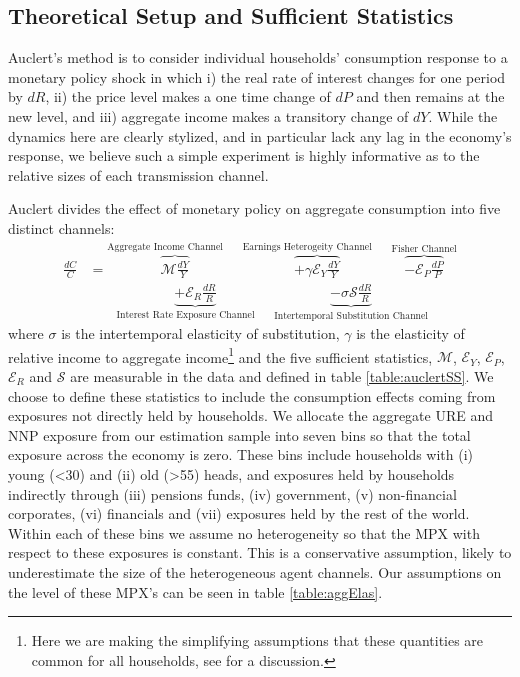 \documentclass[titlepage]{\econtex}\newcommand{\texname}{ConsumptionHeterogeneity}
\begin{document}
\subsection{Theoretical Setup and Sufficient Statistics}
Auclert's method is to consider individual households' consumption response to a monetary policy shock in which i) the real rate of interest changes for one period by $dR$, ii) the price level makes a one time change of $dP$ and then remains at the new level, and iii) aggregate income makes a transitory change of $dY$. While the dynamics here are clearly stylized, and in particular lack any lag in the economy's response, we believe such a simple experiment is highly informative as to the relative sizes of each transmission channel.

Auclert divides the effect of monetary policy on aggregate consumption into five distinct channels:
\begin{align} 
\frac{dC}{C} &= \overbrace{\mathcal{M}\frac{dY}{Y}}^{\text{Aggregate Income Channel}\qquad} \overbrace{ + \gamma \mathcal{E}_Y \frac{dY}{Y}}^{\text{Earnings Heterogeity Channel}\qquad} \overbrace{ - \mathcal{E}_P\frac{dP}{P}}^{\text{Fisher Channel}}  \nonumber \\
& \qquad \underbrace{ + \mathcal{E}_R \frac{dR}{R}}_{\text{Interest Rate Exposure Channel}\qquad}  \underbrace{ - \sigma \mathcal{S}\frac{dR}{R}}_{\text{Intertemporal Substitution Channel}} \label{auclert_channels}
\end{align}
where $\sigma$ is the intertemporal elasticity of substitution, $\gamma$ is the elasticity of relative income to aggregate income\footnote{Here we are making the simplifying assumptions that these quantities are common for all households, see \cite{auclert_monetary_2017} for a discussion.} and the five sufficient statistics, $\mathcal{M}$, $\mathcal{E}_Y$, $\mathcal{E}_P$, $\mathcal{E}_R$ and $\mathcal{S}$ are measurable in the data and defined in table \ref{table:auclertSS}. We choose to define these statistics to include the consumption effects coming from exposures not directly held by households. We allocate the aggregate URE and NNP exposure from our estimation sample into seven bins so that the total exposure across the economy is zero. These bins include households with (i) young (<30) and (ii) old (>55) heads, and exposures held by households indirectly through (iii) pensions funds, (iv) government, (v) non-financial corporates, (vi) financials and (vii) exposures held by the rest of the world. Within each of these bins we assume no heterogeneity so that the MPX with respect to these exposures is constant. This is a conservative assumption, likely to underestimate the size of the heterogeneous agent channels. Our assumptions on the level of these MPX's can be seen in table \ref{table:aggElas}.
\end{document}
